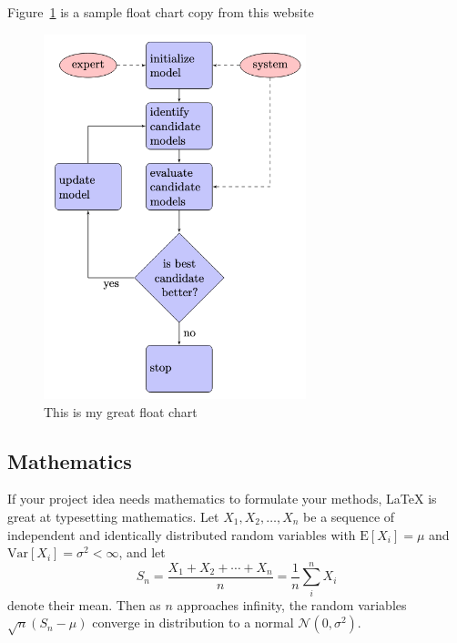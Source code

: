 Figure~\ref{fig:fig3} is a sample float chart copy from this website \cite{floatchart}
   
  \begin{figure}[!ht]
 \centering
 \includegraphics[width=3in]{figures/flowchart.png}

  \caption{\label{fig:fig3}This is my great float chart}
  
  \end{figure}



\subsection{Mathematics}

If your project idea needs mathematics to formulate your methods, \LaTeX{} is great at typesetting mathematics. Let $X_1, X_2, \ldots, X_n$ be a sequence of independent and identically distributed random variables with $\text{E}[X_i] = \mu$ and $\text{Var}[X_i] = \sigma^2 < \infty$, and let
$$S_n = \frac{X_1 + X_2 + \cdots + X_n}{n}
      = \frac{1}{n}\sum_{i}^{n} X_i$$
denote their mean. Then as $n$ approaches infinity, the random variables $\sqrt{n}(S_n - \mu)$ converge in distribution to a normal $\mathcal{N}(0, \sigma^2)$.
